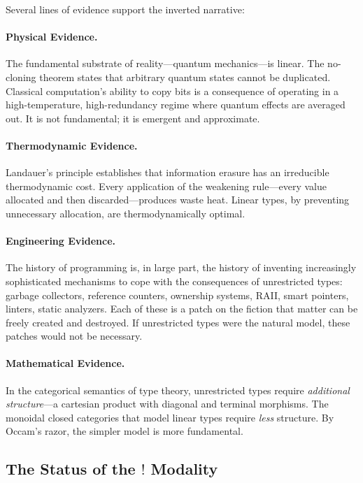 \documentclass[11pt,a4paper]{article}
\newcommand{\bang}{!}
\begin{document}
Several lines of evidence support the inverted narrative:

\paragraph{Physical Evidence.}
The fundamental substrate of reality---quantum mechanics---is linear.
The no-cloning theorem \citep{wootters1982nocloning} states that
arbitrary quantum states cannot be duplicated. Classical
computation's ability to copy bits is a consequence of operating in a
high-temperature, high-redundancy regime where quantum effects are
averaged out. It is not fundamental; it is emergent and approximate.

\paragraph{Thermodynamic Evidence.}
Landauer's principle \citep{landauer1961irreversibility} establishes
that information erasure has an irreducible thermodynamic cost. Every
application of the weakening rule---every value allocated and then
discarded---produces waste heat. Linear types, by preventing
unnecessary allocation, are thermodynamically optimal.

\paragraph{Engineering Evidence.}
The history of programming is, in large part, the history of
inventing increasingly sophisticated mechanisms to cope with the
consequences of unrestricted types: garbage collectors, reference
counters, ownership systems, RAII, smart pointers, linters, static
analyzers. Each of these is a patch on the fiction that matter can
be freely created and destroyed. If unrestricted types were the
natural model, these patches would not be necessary.

\paragraph{Mathematical Evidence.}
In the categorical semantics of type theory, unrestricted types
require \emph{additional structure}---a cartesian product with
diagonal and terminal morphisms. The monoidal closed categories that
model linear types require \emph{less} structure. By Occam's razor,
the simpler model is more fundamental.

\subsection{The Status of the $\bang$ Modality}
\end{document}
